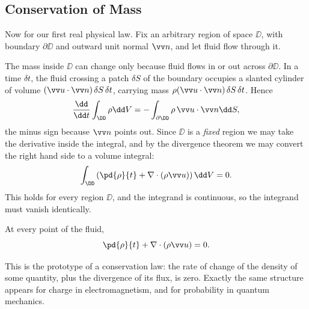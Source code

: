\subsection{Conservation of Mass}

Now for our first real physical law. Fix an arbitrary region of space $\DD$, with boundary $\partial \DD$ and outward unit normal $\vv n$, and let fluid flow through it.

\begin{center}
\end{center}

The mass inside $\DD$ can change only because fluid flows in or out across $\partial\DD$. In a time $\delta t$, the fluid crossing a patch $\delta S$ of the boundary occupies a slanted cylinder of volume $(\vv u \cdot \vv n)\, \delta S \, \delta t$, carrying mass $\rho (\vv u \cdot \vv n) \, \delta S \, \delta t$. Hence
$$
\frac{\dd}{\dd t} \int_\DD \rho \dd V = - \int_{\partial \DD} \rho \, \vv u \cdot \vv n \dd S,
$$
the minus sign because $\vv n$ points out. Since $\DD$ is a \emph{fixed} region we may take the derivative inside the integral, and by the divergence theorem we may convert the right hand side to a volume integral:
$$
\int_\DD \left( \pd{\rho}{t} + \nabla \cdot (\rho \vv u)\right) \dd V = 0.
$$
This holds for every region $\DD$, and the integrand is continuous, so the integrand must vanish identically.

\begin{proposition}
	At every point of the fluid,
	$$
	\pd{\rho}{t} + \nabla \cdot(\rho \vv u) = 0.
	$$
\end{proposition}

This is the prototype of a conservation law: the rate of change of the density of some quantity, plus the divergence of its flux, is zero. Exactly the same structure appears for charge in electromagnetism, and for probability in quantum mechanics.

